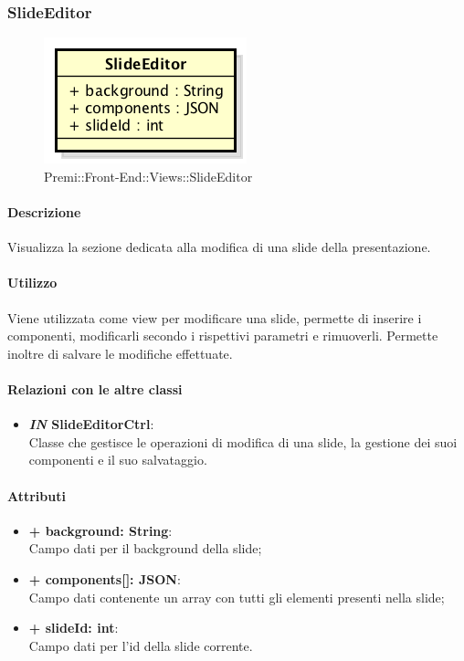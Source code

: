	
\subsubsection{SlideEditor}
	\begin{figure}[h]
		\centering
		\includegraphics[width=0.3\linewidth]{img/premi_front_end_views_slideeditor}
		\caption[Premi::Front-End::Views::SlideEditor]{Premi::Front-End::Views::SlideEditor}
	\end{figure}
	
	\paragraph{Descrizione}
	Visualizza la sezione dedicata alla modifica di una slide della presentazione.
	
	\paragraph{Utilizzo}
	Viene utilizzata come view per modificare una slide, permette di inserire i componenti, modificarli secondo i rispettivi parametri e rimuoverli. Permette inoltre di salvare le modifiche effettuate.
	
	\paragraph{Relazioni con le altre classi}
	\begin{itemize}
		\item \textbf{\textit{IN} SlideEditorCtrl}:\\
		Classe che gestisce le operazioni di modifica di una slide, la gestione dei suoi componenti e il suo salvataggio.
	\end{itemize}
	
	\paragraph{Attributi}
	\begin{itemize}
		\item \textbf{+ background: String}:\\
			Campo dati per il background della slide;
		\item \textbf{+ components[]: JSON}:\\
			Campo dati contenente un array con tutti gli elementi presenti nella slide;
		\item \textbf{+ slideId: int}:\\
			Campo dati per l'id della slide corrente.
	\end{itemize}